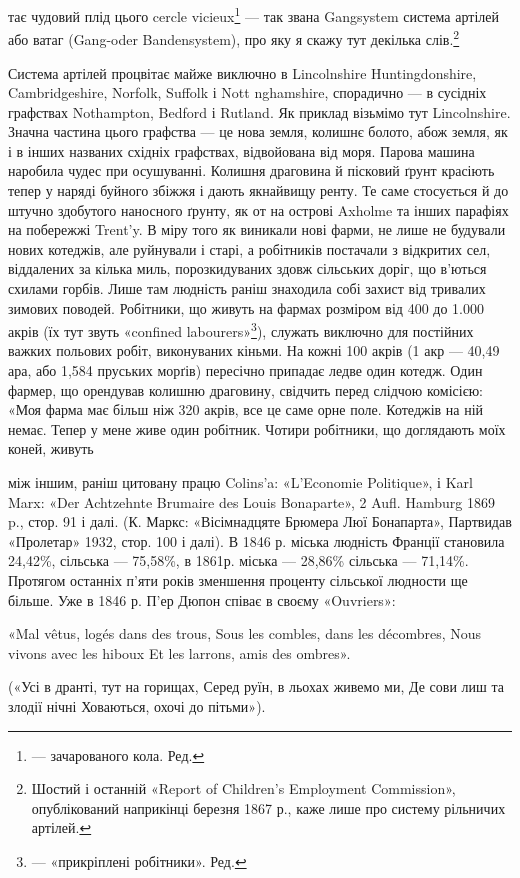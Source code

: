 тає чудовий плід цього cercle vicieux\footnote*{
— зачарованого кола. Ред.
} — так звана Gangsystem
система артілей або ватаг (Gang-oder Bandensystem), про яку
я скажу тут декілька слів.\footnote{
Шостий і останній «Report of Children’s Employment Commission»,
опублікований наприкінці березня 1867 р., каже лише про систему
рільничих артілей.
}

Система артілей процвітає майже виключно в Lincolnshire
Huntingdonshire, Cambridgeshire, Norfolk, Suffolk і Nott nghamshire,
спорадично — в сусідніх графствах Nothampton, Bedford
і Rutland. Як приклад візьмімо тут Lincolnshire. Значна
частина цього графства — це нова земля, колишнє болото, абож
земля, як і в інших названих східніх графствах, відвойована від
моря. Парова машина наробила чудес при осушуванні. Колишня
драговина й пісковий ґрунт красіють тепер у наряді буйного
збіжжя і дають якнайвищу ренту. Те саме стосується й до штучно
здобутого наносного ґрунту, як от на острові Axholme та інших
парафіях на побережжі Trent’y. В міру того як виникали нові
фарми, не лише не будували нових котеджів, але руйнували і
старі, а робітників постачали з відкритих сел, віддалених за
кілька миль, порозкидуваних здовж сільських доріг, що в’ються
схилами горбів. Лише там людність раніш знаходила собі захист
від тривалих зимових поводей. Робітники, що живуть на фармах
розміром від 400 до 1.000 акрів (їх тут звуть «confined labourers»\footnote*{
— «прикріплені робітники». Ред.
}),
служать виключно для постійних важких польових робіт, виконуваних
кіньми. На кожні 100 акрів (1 акр — 40,49 ара, або
1,584 пруських морґів) пересічно припадає ледве один котедж.
Один фармер, що орендував колишню драговину, свідчить перед
слідчою комісією: «Моя фарма має більш ніж 320 акрів, все це
саме орне поле. Котеджів на ній немає. Тепер у мене живе один
робітник. Чотири робітники, що доглядають моїх коней, живуть

між іншим, раніш цитовану працю Colins’a: «L’Economie Politique», і
Karl Marx: «Der Achtzehnte Brumaire des Louis Bonaparte», 2 Aufl.
Hamburg 1869 p., стор. 91 і далі. (К. Маркс: «Вісімнадцяте Брюмера Люї
Бонапарта», Партвидав «Пролетар» 1932, стор. 100 і далі). В 1846 р.
міська людність Франції становила 24,42\%, сільська — 75,58\%, в 1861р.
міська — 28,86\% сільська — 71,14\%. Протягом останніх п’яти років
зменшення проценту сільської людности ще більше. Уже в 1846 р. П’ер
Дюпон співає в своєму «Ouvriers»:

«Mal vêtus, logés dans des trous,
Sous les combles, dans les décombres,
Nous vivons avec les hiboux
Et les larrons, amis des ombres».

(«Усі в дранті, тут на горищах,
Серед руїн, в льохах живемо ми,
Де сови лиш та злодії нічні
Ховаються, охочі до пітьми»).
